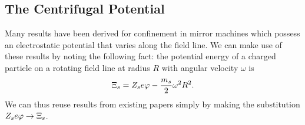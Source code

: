 \documentclass{revtex4}
\begin{document}
\subsection{The Centrifugal Potential}

Many results have been derived for confinement in mirror machines which possess an electrostatic potential that varies along the field line. We can make use of these results by noting the following fact: the potential energy of a charged particle on a rotating field line at radius $R$ with angular velocity $\omega$ is
\begin{equation}
\Xi_s = Z_s e \varphi - \frac{m_s}{2} \omega^2 R^2.
\end{equation}
We can thus reuse results from existing papers simply by making the substitution $Z_s e\varphi \rightarrow \Xi_s$.
\end{document}
